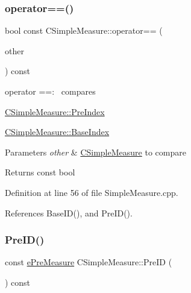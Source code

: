 \mbox{\label{classCSimpleMeasure_aafe9d3871eadf4004a62a8561b883b1e}} 
\subsubsection{\texorpdfstring{operator==()}{operator==()}}
{\footnotesize\ttfamily bool const C\+Simple\+Measure\+::operator== (\begin{DoxyParamCaption}\item[{const \hyperlink{classCSimpleMeasure}{C\+Simple\+Measure} \&}]{other }\end{DoxyParamCaption}) const}



operator ==\+:~\newline
 compares 


\begin{DoxyItemize}
\item \hyperlink{classCSimpleMeasure_aa23ed9eec21adb9a97c90a424e7ee18a}{C\+Simple\+Measure\+::\+Pre\+Index}
\item \hyperlink{classCSimpleMeasure_a191dbfa4cc374946bf8a82111f827d92}{C\+Simple\+Measure\+::\+Base\+Index}
\end{DoxyItemize}


\begin{DoxyParams}{Parameters}
{\em other} & \hyperlink{classCSimpleMeasure}{C\+Simple\+Measure} to compare \\
\hline
\end{DoxyParams}
\begin{DoxyReturn}{Returns}
const bool 
\end{DoxyReturn}


Definition at line 56 of file Simple\+Measure.\+cpp.



References Base\+I\+D(), and Pre\+I\+D().

\mbox{\label{classCSimpleMeasure_ae2704585c95b6a165e982186afef5556}} 
\subsubsection{\texorpdfstring{Pre\+I\+D()}{PreID()}}
{\footnotesize\ttfamily const \hyperlink{PreMeasure_8h_a6c81167b8d4c2badde42f81cb7214620}{e\+Pre\+Measure} C\+Simple\+Measure\+::\+Pre\+ID (\begin{DoxyParamCaption}{ }\end{DoxyParamCaption}) const\hspace{0.3cm}{\ttfamily [inline]}}




